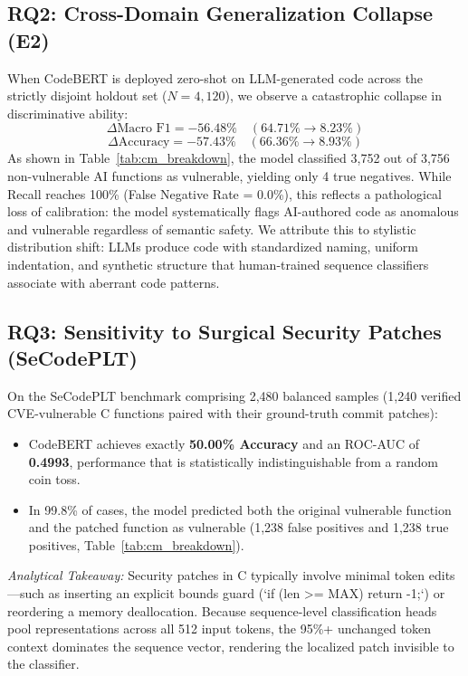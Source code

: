 \documentclass[conference]{IEEEtran}
\begin{document}
\subsection{RQ2: Cross-Domain Generalization Collapse (E2)}
When CodeBERT is deployed zero-shot on LLM-generated code across the strictly disjoint holdout set ($N=4,120$), we observe a catastrophic collapse in discriminative ability:
\begin{equation}
\Delta \text{Macro F1} = -56.48\% \quad (64.71\% \rightarrow 8.23\%)
\end{equation}
\begin{equation}
\Delta \text{Accuracy} = -57.43\% \quad (66.36\% \rightarrow 8.93\%)
\end{equation}
As shown in Table~\ref{tab:cm_breakdown}, the model classified 3,752 out of 3,756 non-vulnerable AI functions as vulnerable, yielding only 4 true negatives. While Recall reaches 100\% (False Negative Rate = 0.0\%), this reflects a pathological loss of calibration: the model systematically flags AI-authored code as anomalous and vulnerable regardless of semantic safety. We attribute this to stylistic distribution shift: LLMs produce code with standardized naming, uniform indentation, and synthetic structure that human-trained sequence classifiers associate with aberrant code patterns.

\subsection{RQ3: Sensitivity to Surgical Security Patches (SeCodePLT)}
On the SeCodePLT benchmark comprising 2,480 balanced samples (1,240 verified CVE-vulnerable C functions paired with their ground-truth commit patches):
\begin{itemize}
    \item CodeBERT achieves exactly \textbf{50.00\% Accuracy} and an ROC-AUC of \textbf{0.4993}, performance that is statistically indistinguishable from a random coin toss.
    \item In 99.8\% of cases, the model predicted both the original vulnerable function and the patched function as vulnerable (1,238 false positives and 1,238 true positives, Table~\ref{tab:cm_breakdown}).
\end{itemize}
\textit{Analytical Takeaway:} Security patches in C typically involve minimal token edits---such as inserting an explicit bounds guard (`if (len >= MAX) return -1;`) or reordering a memory deallocation. Because sequence-level classification heads pool representations across all 512 input tokens, the 95\%+ unchanged token context dominates the sequence vector, rendering the localized patch invisible to the classifier.
\end{document}
